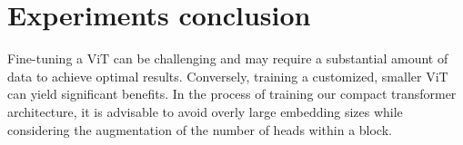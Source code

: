 \section{Experiments conclusion}
Fine-tuning a ViT can be challenging and may require a substantial amount of data to achieve optimal results. Conversely, training a customized, smaller ViT can yield significant benefits. In the process of training our compact transformer architecture, it is advisable to avoid overly large embedding sizes while considering the augmentation of the number of heads within a block.